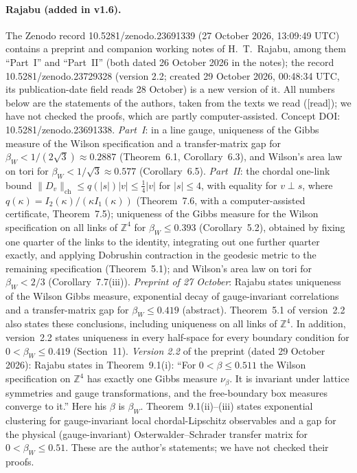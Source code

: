 \documentclass[11pt,a4paper]{article}
\theoremstyle{remark}
\theoremstyle{definition}
\theoremstyle{plain}
\theoremstyle{remark}
\newcommand{\Z}{\mathbb{Z}}
\newcommand{\st}[1]{\textsf{[#1]}}
\begin{document}
\paragraph{Rajabu \cite{Raj26a,Raj26b} (added in v1.6).} The Zenodo record 10.5281/zenodo.23691339 (27 October 2026, 13:09:49 UTC) contains a preprint and companion working notes of H.~T.~Rajabu, among them ``Part~I'' and ``Part~II'' (both dated 26 October 2026 in the notes); the record 10.5281/zenodo.23729328 (version 2.2; created 29 October 2026, 00:48:34 UTC, its publication-date field reads 28 October) is a new version of it. All numbers below are the statements of the authors, taken from the texts we read (\st{read}); we have not checked the proofs, which are partly computer-assisted. Concept DOI: 10.5281/zenodo.23691338.
\emph{Part~I}: in a line gauge, uniqueness of the Gibbs measure of the Wilson specification and a transfer-matrix gap for $\beta_W<1/(2\sqrt3)\approx0.2887$ (Theorem~6.1, Corollary~6.3), and Wilson's area law on tori for $\beta_W<1/\sqrt3\approx0.577$ (Corollary~6.5).
\emph{Part~II}: the chordal one-link bound $\|D_v\|_{\mathrm{ch}}\le q(|s|)|v|\le\frac14|v|$ for $|s|\le4$, with equality for $v\perp s$, where $q(\kappa)=I_2(\kappa)/(\kappa I_1(\kappa))$ (Theorem~7.6, with a computer-assisted certificate, Theorem~7.5); uniqueness of the Gibbs measure for the Wilson specification on all links of $\Z^4$ for $\beta_W\le0.393$ (Corollary~5.2), obtained by fixing one quarter of the links to the identity, integrating out one further quarter exactly, and applying Dobrushin contraction in the geodesic metric to the remaining specification (Theorem~5.1); and Wilson's area law on tori for $\beta_W<2/3$ (Corollary~7.7(iii)).
\emph{Preprint of 27 October}: Rajabu states uniqueness of the Wilson Gibbs measure, exponential decay of gauge-invariant correlations and a transfer-matrix gap for $\beta_W\le0.419$ (abstract). Theorem~5.1 of version~2.2 also states these conclusions, including uniqueness on all links of $\Z^4$. In addition, version~2.2 states uniqueness in every half-space for every boundary condition for $0<\beta_W\le0.419$ (Section~11).
\emph{Version 2.2} of the preprint (dated 29 October 2026): Rajabu states in Theorem~9.1(i): ``For $0<\beta\le0.511$ the Wilson specification on $\Z^4$ has exactly one Gibbs measure $\nu_\beta$. It is invariant under lattice symmetries and gauge transformations, and the free-boundary box measures converge to it.'' Here his $\beta$ is $\beta_W$. Theorem~9.1(ii)--(iii) states exponential clustering for gauge-invariant local chordal-Lipschitz observables and a gap for the physical (gauge-invariant) Osterwalder--Schrader transfer matrix for $0<\beta_W\le0.51$. These are the author's statements; we have not checked their proofs.
\end{document}
